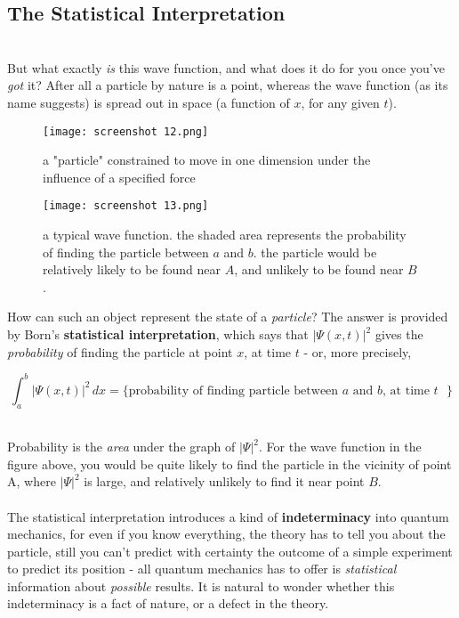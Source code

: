 \documentclass[svgnames]{article}   	%
\begin{document}
\subsection{The Statistical Interpretation} \mbox{}\\


But what exactly \textit{is} this wave function, and what does it do for you
once you've \textit{got} it? After all a particle by nature is a point, whereas
the wave function (as its name suggests) is spread out in space (a function of
$x$, for any given  $t$). 

\begin{figure}[htb!]
  \centering
  \texttt{[image: screenshot 12.png]}
    \caption{a "particle" constrained to move in one dimension under the
    influence of a specified force}
\end{figure}

\begin{figure}[htb!]
  \centering
  \texttt{[image: screenshot 13.png]}
    \caption{a typical wave function. the shaded area represents the
    probability of finding the particle between $a$ and $b$. the particle would
  be relatively likely to be found near  $A$, and unlikely to be found near
$B$.}
\end{figure} 



How can such an object represent the state of a \textit{particle}? The answer
is provided by Born's \textbf{statistical interpretation}, which says that
$|\Psi(x,t)|^2$ gives the \textit{probability} of finding the particle at point
$x$, at time $t$ - or, more precisely, 
\\

\begin{tcolorbox}[colback = blue!5!white, colframe = blue!50!black, title
  = Born's Statistical Interpretation]
\[  
\int_{a}^{b} |\Psi(x,t)|^2\,dx = \{ \text{probability of finding particle
between $a$ and $b$, at time $t$ }\} 
\]
\end{tcolorbox} \mbox{}\\

Probability is the \textit{area} under the graph of $|\Psi|^2$. For the wave
function in the figure above, you would be quite likely to find the particle in
the vicinity of point A, where $|\Psi|^2$ is large, and relatively unlikely to
find it near point $B$. \\ \\ 

The statistical interpretation introduces a kind of \textbf{indeterminacy} into
quantum mechanics, for even if you know everything, the theory has to tell you
about the particle, still you can't predict with certainty the outcome of
a simple experiment to predict its position - all quantum mechanics has to
offer is \textit{statistical} information about \textit{possible} results. It
is natural to wonder whether this indeterminacy is a fact of nature, or
a defect in the theory. \\\\
\end{document}
